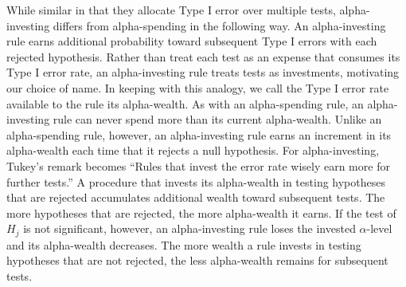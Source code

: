 \documentclass[12pt]{article}
\begin{document}

While similar in that they allocate Type I error over multiple tests,
 alpha-investing differs from alpha-spending in the
 following way.  An alpha-investing rule earns additional probability
 toward subsequent Type I errors with each rejected hypothesis.
  Rather than treat each test as an expense that consumes its Type
 I error rate, an alpha-investing rule treats tests as investments,
 motivating our choice of name.  In keeping with this analogy, we call
 the Type I error rate available to the rule its alpha-wealth.  As
 with an alpha-spending rule, an alpha-investing rule can never spend
 more than its current alpha-wealth.  Unlike an alpha-spending rule,
 however, an alpha-investing rule earns an increment in its
 alpha-wealth each time that it rejects a null hypothesis.  For alpha-investing, Tukey's remark becomes ``Rules that invest the error rate
 wisely earn more for further tests.''  A procedure that
 invests its alpha-wealth in testing hypotheses that are rejected
 accumulates additional wealth toward subsequent tests.  The more
 hypotheses that are rejected, the more alpha-wealth it earns.  If the
 test of $H_j$ is not significant, however, an alpha-investing rule
 loses the invested  $\alpha$-level and its alpha-wealth
 decreases.  The more wealth a rule invests in testing hypotheses that
 are not rejected, the less alpha-wealth remains for subsequent tests.
\end{document}
